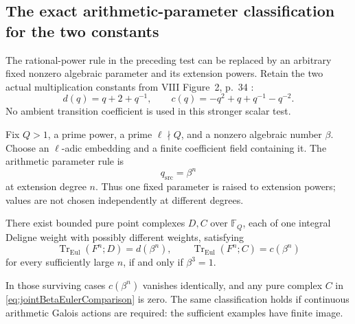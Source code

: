 \subsection{The exact arithmetic-parameter classification for the two constants}

The rational-power rule in the preceding test can be
replaced by an arbitrary fixed nonzero algebraic
parameter and its extension powers. Retain the two
actual multiplication constants from VIII Figure~2,
p.~34 \cite{VIII}:
\[
 d(q)=q+2+q^{-1},\qquad
 c(q)=-q^2+q+q^{-1}-q^{-2}.
\]
No ambient transition coefficient is used in this
stronger scalar test.

Fix \(Q>1\), a prime power, a prime \(\ell\nmid Q\),
and a nonzero algebraic number \(\beta\).
Choose an \(\ell\)-adic embedding and a finite coefficient
field containing it. The arithmetic parameter rule is
\[
                              q_{\mathrm{src}}=\beta^n
\]
at extension degree \(n\). Thus one fixed parameter is
raised to extension powers; values are not chosen
independently at different degrees.

\begin{finding}
\label{f:jointArbitraryArithmeticParameter}
There exist bounded pure point complexes \(D,C\) over
\(\mathbb F_Q\), each of one integral Deligne weight
with possibly different weights, satisfying
\begin{equation}\label{eq:jointBetaEulerComparison}
 \operatorname{Tr}_{\mathrm{Eul}}(F^n;D)=d(\beta^n),
 \qquad
 \operatorname{Tr}_{\mathrm{Eul}}(F^n;C)=c(\beta^n)
\end{equation}
for every sufficiently large \(n\), if and only if
\(\beta^3=1\).

In those surviving cases \(c(\beta^n)\) vanishes
identically, and any pure complex \(C\) in
\eqref{eq:jointBetaEulerComparison} is zero.
The same classification holds if continuous arithmetic
Galois actions are required: the sufficient examples
have finite image.
\end{finding}


